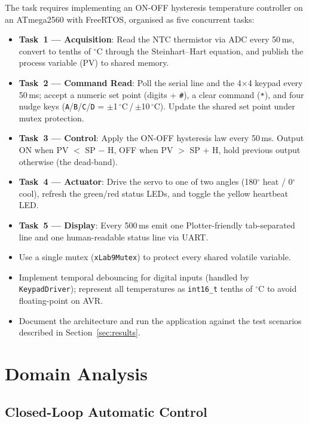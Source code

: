 \documentclass[12pt]{article}
\begin{document}
The task requires implementing an ON-OFF hysteresis temperature controller on an ATmega2560 with FreeRTOS, organised as five concurrent tasks:
\begin{itemize}
  \item \textbf{Task~1 --- Acquisition}: Read the NTC thermistor via ADC every 50\,ms, convert to tenths of $^{\circ}$C through the Steinhart--Hart equation, and publish the process variable (PV) to shared memory.
  \item \textbf{Task~2 --- Command Read}: Poll the serial line and the 4$\times$4 keypad every 50\,ms; accept a numeric set point (digits + \texttt{\#}), a clear command (\texttt{*}), and four nudge keys (\texttt{A}/\texttt{B}/\texttt{C}/\texttt{D} = $\pm$1\,$^{\circ}$C\,/\,$\pm$10\,$^{\circ}$C). Update the shared set point under mutex protection.
  \item \textbf{Task~3 --- Control}: Apply the ON-OFF hysteresis law every 50\,ms. Output ON when PV $<$ SP $-$ H, OFF when PV $>$ SP $+$ H, hold previous output otherwise (the dead-band).
  \item \textbf{Task~4 --- Actuator}: Drive the servo to one of two angles (180$^{\circ}$ heat / 0$^{\circ}$ cool), refresh the green/red status LEDs, and toggle the yellow heartbeat LED.
  \item \textbf{Task~5 --- Display}: Every 500\,ms emit one Plotter-friendly tab-separated line and one human-readable status line via UART.
  \item Use a single mutex (\texttt{xLab9Mutex}) to protect every shared volatile variable.
  \item Implement temporal debouncing for digital inputs (handled by \texttt{KeypadDriver}); represent all temperatures as \texttt{int16\_t} tenths of $^{\circ}$C to avoid floating-point on AVR.
  \item Document the architecture and run the application against the test scenarios described in Section~\ref{sec:results}.
\end{itemize}

\section{Domain Analysis}

\subsection{Closed-Loop Automatic Control}
\end{document}
